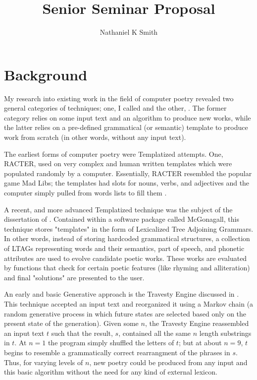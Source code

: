 \documentclass[10pt]{article}
\title{Senior Seminar Proposal}
\author{Nathaniel K Smith}
\begin{document}
\maketitle

\section{Background} 
My research into existing work in the field of computer poetry revealed two
general categories of techniques; one, I called  and the other,
. The former category relies on some input text and an
algorithm to produce new works, while the latter relies on a pre-defined
grammatical (or semantic) template to produce work from scratch (in other
words, without any input text).  

The earliest forms of computer poetry were Templatized attempts. One, RACTER,
used on very complex and human written templates which were populated randomly
by a computer. Essentially, RACTER resembled the popular game Mad Libs; the
templates had slots for nouns, verbs, and adjectives and the computer simply
pulled from words lists to fill them \cite{Hart96}.

A recent, and more advanced Templatized technique was the subject of the
dissertation of \cite{Manurung03}. Contained within a software package called
McGonagall, this technique stores "templates" in the form of Lexicalized Tree
Adjoining Grammars. In other words, instead of storing hardcoded grammatical
structures, a collection of LTAGs representing words and their semantics, part
of speech, and phonetic attributes are used to evolve candidate poetic works.
These works are evaluated by functions that check for certain poetic features
(like rhyming and alliteration) and final "solutions" are presented to the
user.

An early and basic Generative approach is the Travesty Engine discussed in
\cite{Hart96}. This technique accepted an input text and reorganized it using a
Markov chain (a random generative process in which future states are selected
based only on the present state of the generation). Given some $n$, the
Travesty Engine reassembled an input text $t$ such that the result, $s$,
contained all the same $n$ length substrings in $t$. At $n = 1$ the program
simply shuffled the letters of $t$; but at about $n = 9$, $t$ begins to
resemble a grammatically correct rearrangment of the phrases in $s$. Thus, for
varying levels of $n$, new poetry could be produced from any input and this
basic algorithm without the need for any kind of external lexicon.
\end{document}
